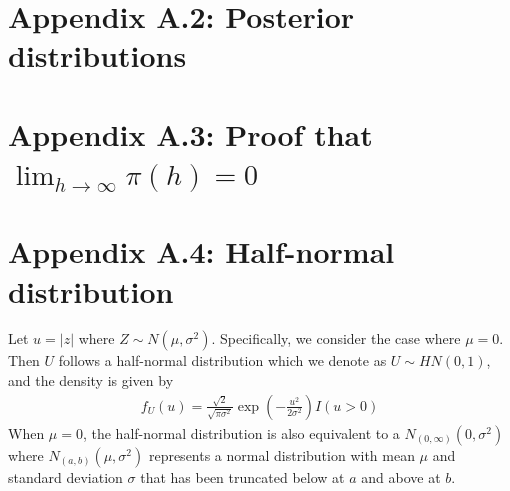 \documentclass[11pt]{article}
\begin{document}
\section*{Appendix A.2: Posterior distributions}





\section*{Appendix A.3: Proof that $\lim_{h \rightarrow \infty} \pi(h) = 0$}


\section*{Appendix A.4: Half-normal distribution}
Let $u = |z|$ where $Z \sim N(\mu, \sigma^2)$.
Specifically, we consider the case where $\mu = 0$. Then $U$ follows a half-normal distribution which we denote as $U \sim HN(0, 1)$, and the density is given by
\begin{align}
  f_U(u) = \frac{ \sqrt{2} }{ \sqrt{\pi \sigma^2} } \exp \left( - \frac{ u^2 }{ 2 \sigma^2 } \right) I(u > 0)
\end{align}
When $\mu = 0$, the half-normal distribution is also equivalent to a $N_{(0, \infty)}(0, \sigma^2)$ where $N_{(a, b)}(\mu, \sigma^2)$ represents a normal distribution with mean $\mu$ and standard deviation $\sigma$ that has been truncated below at $a$ and above at $b$.



\end{document}
